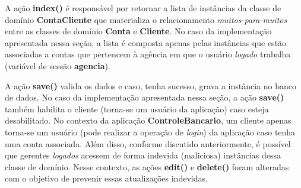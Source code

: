\vspace{0.1cm}


A ação {\bf index()} é responsável  por retornar a lista de instâncias da classe
de   domínio  {\bf   ContaCliente}   que  materializa   o  relacionamento   {\em
  muitos-para-muitos}  entre   as  classes  de   domínio  {\bf  Conta}   e  {\bf
  Cliente}. No caso da implementação apresentada nessa seção, a lista é composta
apenas pelas instâncias que estão associadas a contas que pertencem à agência em
que o usuário {\it logado} trabalha (variável de sessão {\bf agencia}).  

\vspace{0.1cm}

A ação {\bf save()} valida os dados  e caso, tenha sucesso, grava a instância no
banco de  dados. No caso da  implementação apresentada nessa seção,  a ação {\bf
  save()}  também habilita  o cliente  (torna-se um  usuário da  aplicação) caso
esteja desabilitado. No contexto da aplicação {\bf ControleBancario}, um cliente
apenas  torna-se  um  usuário (pode  realizar  a  operação  de {\it  login})  da
aplicação  caso  tenha  uma  conta  associada. Além  disso,  conforme  discutido
anteriormente, é possível  que gerentes {\it logados} acessem  de forma indevida
(maliciosa) instâncias dessa  classe de domínio.  Nesse contexto,  as ações {\bf
  edit()}  e {\bf delete()}  foram alteradas  com o  objetivo de  prevenir essas
atualizações indevidas.  

